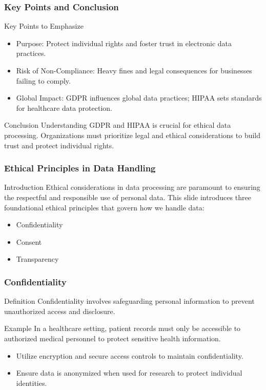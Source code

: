\documentclass{beamer}
\begin{document}
\begin{frame}[fragile]
    \frametitle{Key Points and Conclusion}
    \begin{block}{Key Points to Emphasize}
        \begin{itemize}
            \item Purpose: Protect individual rights and foster trust in electronic data practices.
            \item Risk of Non-Compliance: Heavy fines and legal consequences for businesses failing to comply.
            \item Global Impact: GDPR influences global data practices; HIPAA sets standards for healthcare data protection.
        \end{itemize}
    \end{block}
    \begin{block}{Conclusion}
        Understanding GDPR and HIPAA is crucial for ethical data processing. Organizations must prioritize legal and ethical considerations to build trust and protect individual rights.
    \end{block}
\end{frame}

\begin{frame}[fragile]
    \frametitle{Ethical Principles in Data Handling}
    \begin{block}{Introduction}
        Ethical considerations in data processing are paramount to ensuring the respectful and responsible use of personal data. This slide introduces three foundational ethical principles that govern how we handle data: 
        \begin{itemize}
            \item Confidentiality
            \item Consent
            \item Transparency
        \end{itemize}
    \end{block}
\end{frame}

\begin{frame}[fragile]
    \frametitle{Confidentiality}
    \begin{block}{Definition}
        Confidentiality involves safeguarding personal information to prevent unauthorized access and disclosure.
    \end{block}
    \begin{exampleblock}{Example}
        In a healthcare setting, patient records must only be accessible to authorized medical personnel to protect sensitive health information.
    \end{exampleblock}
    \begin{itemize}
        \item Utilize encryption and secure access controls to maintain confidentiality.
        \item Ensure data is anonymized when used for research to protect individual identities.
    \end{itemize}
\end{frame}
\end{document}
